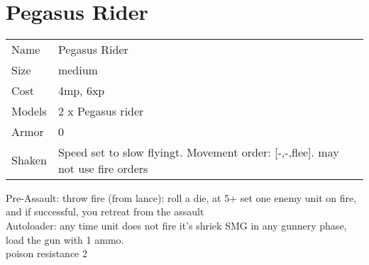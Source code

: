  
\ \\













\clearpage

\section{ Pegasus Rider }

\begin{tabular}{ll}
  Name & Pegasus Rider \\
  Size & medium\\
  Cost & 4mp, 6xp\\
  Models & 2 x Pegasus rider\\
  Armor & 0\\
  Shaken & Speed set to slow flyingt. Movement order: [-,-,flee]. may not use fire orders\\
\end{tabular}

\noindent Pre-Assault: throw fire (from lance): roll a die, at 5+ set one enemy unit on fire, and if successful, you retreat from the assault\\ 
Autoloader: any time unit does not fire it's shriek SMG in any gunnery phase, load the gun with 1 ammo.\\ 
poison resistance 2\\ 


